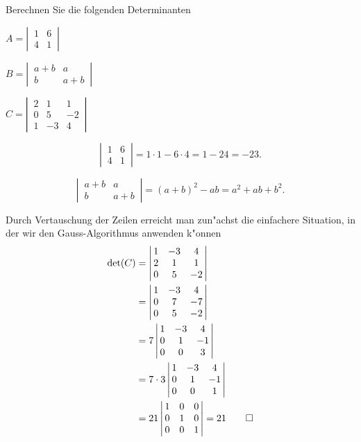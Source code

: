 Berechnen Sie die folgenden Determinanten
\begin{teilaufgaben}
\item $A=\left|\,\begin{matrix}1&6\\4&1\end{matrix}\,\right|$
\item $B=\left|\,\begin{matrix}a+b&a\\b&a+b\end{matrix}\,\right|$
\item $C=\left|\,\begin{matrix}2&1&1\\0&5&-2\\1&-3&4\end{matrix}\,\right|$
\end{teilaufgaben}

\begin{loesung}
\begin{teilaufgaben}
\item
\[
\left|\,\begin{matrix}1&6\\4&1\end{matrix}\,\right|=1\cdot 1-6\cdot 4=1-24=-23.
\]
\item
\[
\left|\,\begin{matrix}a+b&a\\b&a+b\end{matrix}\,\right|=(a+b)^2 -ab=a^2+ab+b^2.
\]
\item Durch Vertauschung der Zeilen erreicht man zun"achst die einfachere
Situation, in der wir den Gauss-Algorithmus anwenden k"onnen
\begin{align*}
\det(C)&=
\left|\,\begin{matrix}
1&-3&4\\
2&1&1\\
0&5&-2
\end{matrix}\,\right|
\\
&=
\left|\,\begin{matrix}
1&-3&4\\
0&7&-7\\
0&5&-2
\end{matrix}\,\right|
\\
&=
7\left|\,\begin{matrix}
1&-3&4\\
0&1&-1\\
0&0&3
\end{matrix}\,\right|
\\
&=
7\cdot 3
\left|\,\begin{matrix}
1&-3&4\\
0&1&-1\\
0&0&1
\end{matrix}\,\right|
\\
&=21
\left|\,\begin{matrix}
1&0&0\\
0&1&0\\
0&0&1
\end{matrix}\,\right|=21
\qedhere
\end{align*}
\end{teilaufgaben}
\end{loesung}
